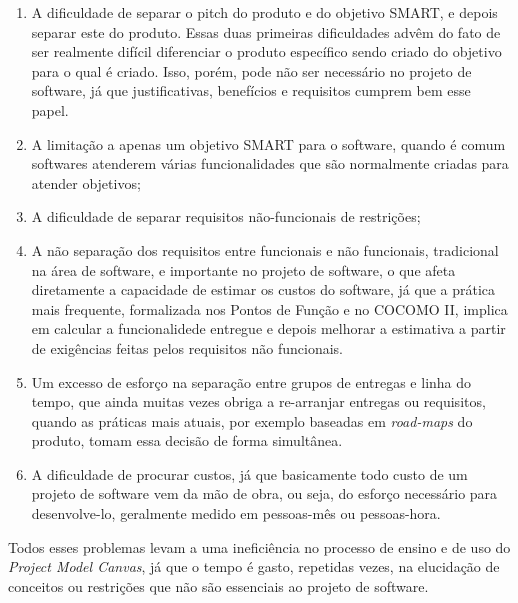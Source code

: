 \documentclass[a4]{report}
\begin{document}
\begin{enumerate}
    \item A dificuldade de separar o pitch do produto e do objetivo SMART, e depois separar este do produto. Essas duas primeiras dificuldades advêm do fato de ser realmente difícil diferenciar o produto específico sendo criado do objetivo para o qual é criado. Isso, porém, pode não ser necessário no projeto de software, já que justificativas, benefícios e requisitos cumprem bem esse papel.
    \item A limitação a apenas um objetivo SMART para o software, quando é comum softwares atenderem várias funcionalidades que são normalmente criadas para atender objetivos;
    \item A dificuldade de separar requisitos não-funcionais de restrições;
    \item A não separação dos requisitos entre funcionais e não funcionais, tradicional na área de software, e importante no projeto de software, o que afeta diretamente a capacidade de estimar os custos do software, já que a prática mais frequente, formalizada nos Pontos de Função\citep{ifpug:guide:2012} e no COCOMO II\citeauthor{cocomo2:manual}, implica em calcular a funcionalidede entregue e depois melhorar a estimativa a partir de exigências feitas pelos requisitos não funcionais.
    \item Um excesso de esforço na separação entre grupos de entregas e linha do tempo, que ainda muitas vezes obriga a re-arranjar entregas ou requisitos, quando as práticas mais atuais, por exemplo baseadas em \textit{road-maps} do produto, tomam essa decisão de forma simultânea.
    \item \label{problems:total} A dificuldade de procurar custos, já que basicamente todo custo de um projeto de software vem da mão de obra, ou seja, do esforço necessário para desenvolve-lo, geralmente medido em pessoas-mês ou pessoas-hora.
\end{enumerate}

Todos esses problemas levam a uma ineficiência no processo de ensino e de uso do \textit{Project Model Canvas}, já que o tempo é gasto, repetidas vezes, na elucidação de conceitos ou restrições que não são essenciais ao projeto de software.
\end{document}
